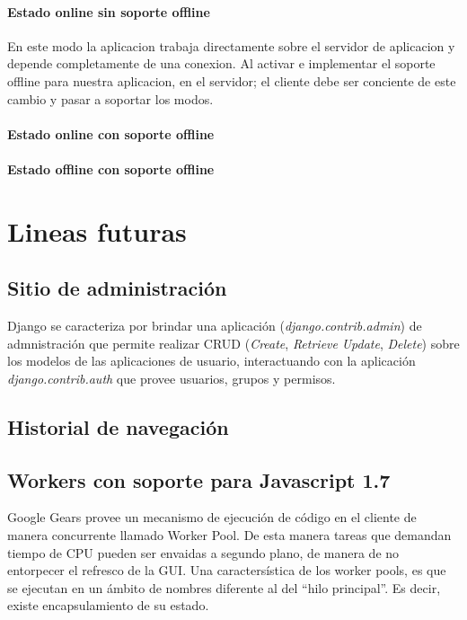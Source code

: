 \documentclass[a4paper]{report}
\begin{document}
\subsubsection{Estado online sin soporte offline}
En este modo la aplicacion trabaja directamente sobre el servidor de aplicacion y depende completamente de una conexion.
Al activar e implementar el soporte offline para nuestra aplicacion, en el servidor; el cliente debe ser conciente de este cambio y pasar a soportar los modos.
\subsubsection{Estado online con soporte offline}
\subsubsection{Estado offline con soporte offline}

\chapter{Lineas futuras}
\section{Sitio de administración}
Django se caracteriza por brindar una aplicación (\textit{django.contrib.admin})
de admnistración que permite realizar CRUD (\textit{Create}, \textit{Retrieve}
\textit{Update}, \textit{Delete}) sobre los modelos de las aplicaciones de
usuario, interactuando con la aplicación \textit{django.contrib.auth} que provee
usuarios, grupos y permisos.
 
\section{Historial de navegación}

\section{Workers con soporte para Javascript 1.7}
Google Gears provee un mecanismo de ejecución de código en el cliente de manera
concurrente llamado Worker Pool. De esta manera tareas que demandan tiempo de
CPU pueden ser envaidas a segundo plano, de manera de no entorpecer el refresco 
de la GUI.
Una caractersística de los worker pools, es que se ejecutan en un ámbito de 
nombres diferente al del ``hilo principal''. Es decir, existe encapsulamiento
de su estado.
 
\end{document}
